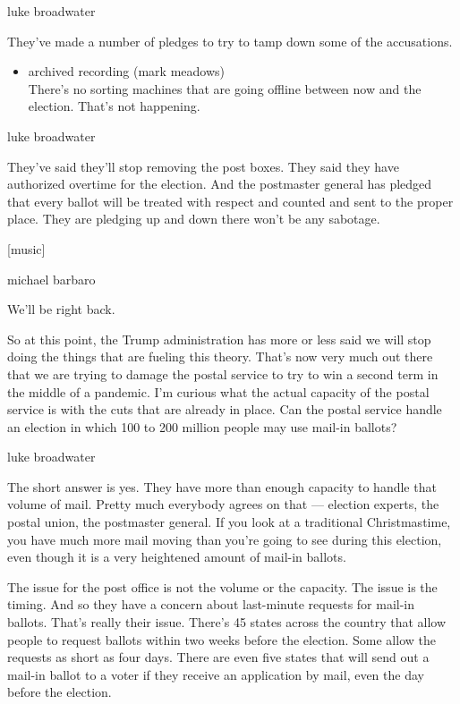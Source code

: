 luke broadwater

They've made a number of pledges to try to tamp down some of the
accusations.

\begin{itemize}
\tightlist
\item
  archived recording (mark meadows)\\
  There's no sorting machines that are going offline between now and the
  election. That's not happening.
\end{itemize}

luke broadwater

They've said they'll stop removing the post boxes. They said they have
authorized overtime for the election. And the postmaster general has
pledged that every ballot will be treated with respect and counted and
sent to the proper place. They are pledging up and down there won't be
any sabotage.

{[}music{]}

michael barbaro

We'll be right back.

So at this point, the Trump administration has more or less said we will
stop doing the things that are fueling this theory. That's now very much
out there that we are trying to damage the postal service to try to win
a second term in the middle of a pandemic. I'm curious what the actual
capacity of the postal service is with the cuts that are already in
place. Can the postal service handle an election in which 100 to 200
million people may use mail-in ballots?

luke broadwater

The short answer is yes. They have more than enough capacity to handle
that volume of mail. Pretty much everybody agrees on that --- election
experts, the postal union, the postmaster general. If you look at a
traditional Christmastime, you have much more mail moving than you're
going to see during this election, even though it is a very heightened
amount of mail-in ballots.

The issue for the post office is not the volume or the capacity. The
issue is the timing. And so they have a concern about last-minute
requests for mail-in ballots. That's really their issue. There's 45
states across the country that allow people to request ballots within
two weeks before the election. Some allow the requests as short as four
days. There are even five states that will send out a mail-in ballot to
a voter if they receive an application by mail, even the day before the
election.

